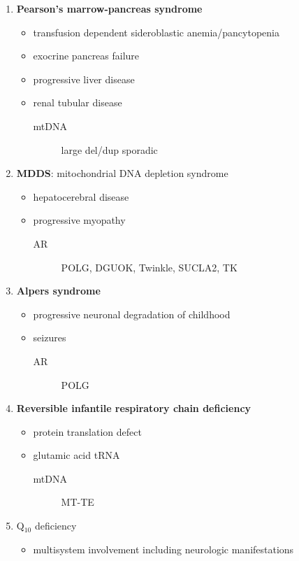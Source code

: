 \documentclass{scrartcl}
\begin{document}
\begin{enumerate}
\begin{enumerate}
\item \textbf{Pearson's marrow-pancreas syndrome}
\label{sec:org1b857f3}
\begin{itemize}
\item transfusion dependent sideroblastic anemia/pancytopenia
\item exocrine pancreas failure
\item progressive liver disease
\item renal tubular disease
\begin{description}
\item[{mtDNA}] large del/dup sporadic
\end{description}
\end{itemize}
\item \textbf{MDDS}: mitochondrial DNA depletion syndrome
\label{sec:orgdaa5ece}
\begin{itemize}
\item hepatocerebral disease
\item progressive myopathy
\begin{description}
\item[{AR}] POLG, DGUOK, Twinkle, SUCLA2, TK
\end{description}
\end{itemize}
\item \textbf{Alpers syndrome}
\label{sec:org3acb59f}
\begin{itemize}
\item progressive neuronal degradation of childhood
\item seizures
\begin{description}
\item[{AR}] POLG
\end{description}
\end{itemize}
\item \textbf{Reversible infantile respiratory chain deficiency}
\label{sec:orgd57a352}
\begin{itemize}
\item protein translation defect
\item glutamic acid tRNA
\begin{description}
\item[{mtDNA}] MT-TE
\end{description}
\end{itemize}
\item Q\(_{\text{10}}\) deficiency
\label{sec:orga89c7f4}
\begin{itemize}
\item multisystem involvement including neurologic manifestations

\end{itemize}
\end{enumerate}
\end{enumerate}
\end{document}
